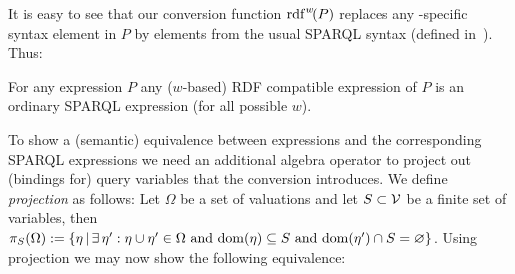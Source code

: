 \begin{enumerate}
%
\end{enumerate}

\noindent
It is easy to see that our conversion function $\mathrm{rdf}^{w}\!(P)$ replaces any \SPARQLplus-spe\-cif\-ic syntax element in $P$ by elements from the usual SPARQL syntax (defined in~\cite{Perez09:SemanticsAndComplexityOfSPARQL}). Thus:

\begin{proposition} \label{Proposition:EquivalenceOfSyntaxAfterConverting}
	For any {\SPARQLplus} expression $P$ any ($w$-based) RDF compatible expression of $P$ is an ordinary SPARQL expression (for all possible $w$).
\end{proposition}

\noindent
To show a (semantic) equivalence between {\SPARQLplus} expressions and the corresponding SPARQL expressions we need an additional algebra operator to project out (bindings for) query variables that the conversion introduces. We define \emph{projection} as follows: Let $\Omega$ be a set of valuations and let $S \subset \mathcal{V}$ be a finite set of variables, then $\pi_S ( \Omega ) := \lbrace \eta \,|\, \exists \, \eta' : \eta \cup \eta' \in \Omega \text{ and } \mathrm{dom}(\eta) \subseteq S \text{ and } \mathrm{dom}(\eta') \cap S = \varnothing \rbrace$.
Using projection we may now show the following equivalence:

